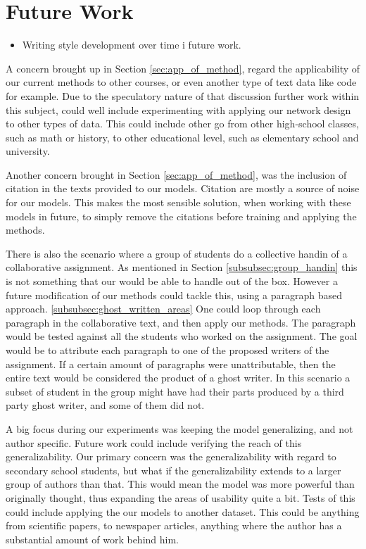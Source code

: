 \section{Future Work} \label{sec:future_work}


\begin{itemize}

    \item Writing style development over time i future work.

\end{itemize}

A concern brought up in Section \ref{sec:app_of_method}, regard the
applicability of our current methods to other courses, or even another type
of text data like code for example. Due to the speculatory nature of that
discussion further work within this subject, could well include experimenting
with applying our network design to other types of data. This could include
other go from other high-school classes, such as math or history, to other
educational level, such as elementary school and university.

Another concern brought in Section \ref{sec:app_of_method}, was the inclusion
of citation in the texts provided to our models. Citation are mostly a source
of noise for our models. This makes the most sensible solution, when working
with these models in future, to simply remove the citations before training and
applying the methods.

There is also the scenario where a group of students do a collective handin of a
collaborative assignment. As mentioned in Section \ref{subsubsec:group_handin}
this is not something that our would be able to handle out of the box. However
a future modification of our methods could tackle this, using a paragraph based
approach. \ref{subsubsec:ghost_written_areas} One could loop through each
paragraph in the collaborative text, and then apply our methods. The paragraph
would be tested against all the students who worked on the assignment. The goal
would be to attribute each paragraph to one of the proposed writers of the
assignment. If a certain amount of paragraphs were unattributable, then the
entire text would be considered the product of a ghost writer. In this scenario
a subset of student in the group might have had their parts produced by a third
party ghost writer, and some of them did not.

A big focus during our experiments was keeping the model generalizing, and
not author specific. Future work could include verifying the reach of this
generalizability. Our primary concern was the generalizability with regard to
secondary school students, but what if the generalizability extends to a larger
group of authors than that. This would mean the model was more powerful than
originally thought, thus expanding the areas of usability quite a bit. Tests
of this could include applying the our models to another dataset. This could
be anything from scientific papers, to newspaper articles, anything where the
author has a substantial amount of work behind him.

